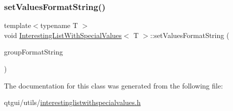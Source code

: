 \mbox{\label{class_interesting_list_with_special_values_ad715bd4c8218c178fc0911ff0c60a8aa}} 
\subsubsection{\texorpdfstring{setValuesFormatString()}{setValuesFormatString()}}
{\footnotesize\ttfamily template$<$typename T $>$ \\
void \mbox{\hyperlink{class_interesting_list_with_special_values}{Interesting\+List\+With\+Special\+Values}}$<$ T $>$\+::set\+Values\+Format\+String (\begin{DoxyParamCaption}\item[{Q\+String}]{group\+Format\+String }\end{DoxyParamCaption})\hspace{0.3cm}{\ttfamily [inline]}}



The documentation for this class was generated from the following file\+:\begin{DoxyCompactItemize}
\item 
qtgui/utils/\mbox{\hyperlink{interestinglistwithspecialvalues_8h}{interestinglistwithspecialvalues.\+h}}\end{DoxyCompactItemize}
